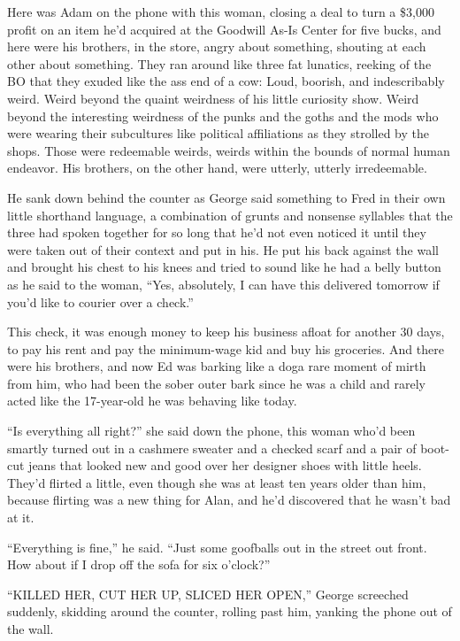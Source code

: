 Here was Adam on the phone with this woman, closing a deal to turn a
\$3,000 profit on an item he'd acquired at the Goodwill As-Is Center
for five bucks, and here were his brothers, in the store, angry about
something, shouting at each other about something.  They ran around
like three fat lunatics, reeking of the BO that they exuded like the
ass end of a cow:  Loud, boorish, and indescribably weird.  Weird
beyond the quaint weirdness of his little curiosity show.  Weird
beyond the interesting weirdness of the punks and the goths and the
mods who were wearing their subcultures like political affiliations as
they strolled by the shops.  Those were redeemable weirds, weirds
within the bounds of normal human endeavor.  His brothers, on the
other hand, were utterly, utterly irredeemable.

He sank down behind the counter as George said something to Fred in
their own little shorthand language, a combination of grunts and
nonsense syllables that the three had spoken together for so long that
he'd not even noticed it until they were taken out of their context
and put in his.  He put his back against the wall and brought his
chest to his knees and tried to sound like he had a belly button as he
said to the woman, ``Yes, absolutely, I can have this delivered
tomorrow if you'd like to courier over a check.''

This check, it was enough money to keep his business afloat for
another 30 days, to pay his rent and pay the minimum-wage kid and buy
his groceries.  And there were his brothers, and now Ed was barking
like a dog\dash{}a rare moment of mirth from him, who had been the sober
outer bark since he was a child and rarely acted like the 17-year-old
he was behaving like today.

``Is everything all right?'' she said down the phone, this woman who'd
been smartly turned out in a cashmere sweater and a checked scarf and
a pair of boot-cut jeans that looked new and good over her designer
shoes with little heels.  They'd flirted a little, even though she was
at least ten years older than him, because flirting was a new thing
for Alan, and he'd discovered that he wasn't bad at it.

``Everything is fine,'' he said.  ``Just some goofballs out in the
street out front.  How about if I drop off the sofa for six o'clock?''

``KILLED HER, CUT HER UP, SLICED HER OPEN,'' George screeched
suddenly, skidding around the counter, rolling past him, yanking the
phone out of the wall.

